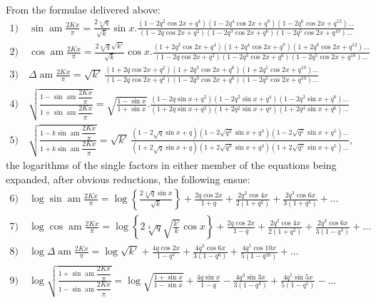 \documentclass{article}
\begin{document}
From the formulae delivered above:
\[
\begin{gathered}
\text{1)}\quad\sin\operatorname{am}\frac{2Kx}{\pi}=\frac{2\sqrt[4]{q}}{\sqrt{k}}\sin x.\frac{(1-2q^{2}\cos2x+q^{4})(1-2q^{4}\cos2x+q^{8})(1-2q^{6}\cos2x+q^{12})\ldots}{(1-2q\cos2x+q^{2})(1-2q^{3}\cos2x+q^{6})(1-2q^{5}\cos2x+q^{10})\ldots}\\[1.5ex]
\text{2)}\quad\cos\operatorname{am}\frac{2Kx}{\pi}=\frac{2\sqrt[4]{q}\sqrt{k'}}{\sqrt{k}}\cos x.\frac{(1+2q^{2}\cos2x+q^{4})(1+2q^{4}\cos2x+q^{8})(1+2q^{6}\cos2x+q^{12})\ldots}{(1-2q\cos2x+q^{2})(1-2q^{3}\cos2x+q^{6})(1-2q^{5}\cos2x+q^{10})\ldots}\\[1.5ex]
\text{3)}\quad\Delta\operatorname{am}\frac{2Kx}{\pi}=\sqrt{k'}\,\frac{(1+2q\cos2x+q^{2})(1+2q^{3}\cos2x+q^{6})(1+2q^{5}\cos2x+q^{10})\ldots}{(1-2q\cos2x+q^{2})(1-2q^{3}\cos2x+q^{6})(1-2q^{5}\cos2x+q^{10})\ldots}\\[1.5ex]
\text{4)}\quad\sqrt{\frac{1-\sin\operatorname{am}\dfrac{2Kx}{\pi}}{1+\sin\operatorname{am}\dfrac{2Kx}{\pi}}}=\sqrt{\frac{1-\sin x}{1+\sin x}}.\frac{(1-2q\sin x+q^{2})(1-2q^{2}\sin x+q^{4})(1-2q^{3}\sin x+q^{6})\ldots}{(1+2q\sin x+q^{2})(1+2q^{2}\sin x+q^{4})(1+2q^{3}\sin x+q^{6})\ldots}\\[1.5ex]
\text{5)}\quad\sqrt{\frac{1-k\sin\operatorname{am}\dfrac{2Kx}{\pi}}{1+k\sin\operatorname{am}\dfrac{2Kx}{\pi}}}=\sqrt{k'}\,\frac{(1-2\sqrt{q}\sin x+q)(1-2\sqrt{q^{3}}\sin x+q^{3})(1-2\sqrt{q^{5}}\sin x+q^{5})\ldots}{(1+2\sqrt{q}\sin x+q)(1+2\sqrt{q^{3}}\sin x+q^{3})(1+2\sqrt{q^{5}}\sin x+q^{5})\ldots},
\end{gathered}
\]
the logarithms of the single factors in either member of the equations being expanded, after obvious reductions, the following ensue:
\[
\begin{gathered}
\text{6)}\quad\log\sin\operatorname{am}\frac{2Kx}{\pi}=\log\left\{\frac{2\sqrt[4]{q}\sin x}{\sqrt{k}}\right\}+\frac{2q\cos2x}{1+q}+\frac{2q^{2}\cos4x}{2(1+q^{2})}+\frac{2q^{3}\cos6x}{3(1+q^{3})}+\ldots\\[1.5ex]
\text{7)}\quad\log\cos\operatorname{am}\frac{2Kx}{\pi}=\log\left\{2\sqrt[4]{q}\sqrt{\frac{k'}{k}}\cos x\right\}+\frac{2q\cos2x}{1-q}+\frac{2q^{2}\cos4x}{2(1+q^{2})}+\frac{2q^{3}\cos6x}{3(1-q^{3})}+\ldots\\[1.5ex]
\text{8)}\quad\log\Delta\operatorname{am}\frac{2Kx}{\pi}=\log\sqrt{k'}+\frac{4q\cos2x}{1-q^{2}}+\frac{4q^{3}\cos6x}{3(1-q^{6})}+\frac{4q^{5}\cos10x}{5(1-q^{10})}+\ldots\\[1.5ex]
\text{9)}\quad\log\sqrt{\frac{1+\sin\operatorname{am}\dfrac{2Kx}{\pi}}{1-\sin\operatorname{am}\dfrac{2Kx}{\pi}}}=\log\sqrt{\frac{1+\sin x}{1-\sin x}}+\frac{4q\sin x}{1-q}-\frac{4q^{3}\sin3x}{3(1-q^{3})}+\frac{4q^{5}\sin5x}{5(1-q^{5})}-\ldots
\end{gathered}
\]
\end{document}
